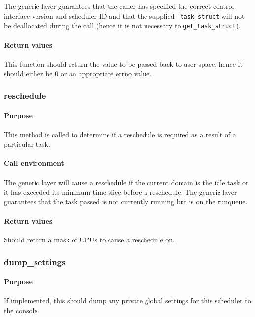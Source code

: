 \documentclass[11pt,twoside,final,openright]{xenstyle}
\begin{document}
The generic layer guarantees that the caller has specified the correct
control interface version and scheduler ID and that the supplied {\tt
task\_struct} will not be deallocated during the call (hence it is not
necessary to {\tt get\_task\_struct}).

\paragraph*{Return values}

This function should return the value to be passed back to user space, hence it
should either be 0 or an appropriate errno value.

\subsubsection{reschedule}

\paragraph*{Purpose}

This method is called to determine if a reschedule is required as a result of a
particular task.

\paragraph*{Call environment}
The generic layer will cause a reschedule if the current domain is the idle
task or it has exceeded its minimum time slice before a reschedule.  The
generic layer guarantees that the task passed is not currently running but is
on the runqueue.

\paragraph*{Return values}

Should return a mask of CPUs to cause a reschedule on.

\subsubsection{dump\_settings}

\paragraph*{Purpose}

If implemented, this should dump any private global settings for this
scheduler to the console.
\end{document}
